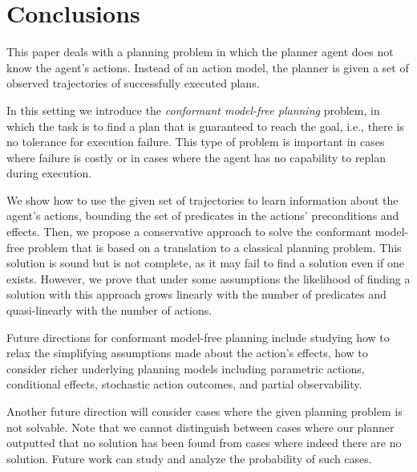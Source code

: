\documentclass[letterpaper]{article}
\begin{document}
\section{Conclusions}
This paper deals with a planning problem in which the planner agent does not know the agent's actions. Instead of an action model, the planner is given a set of observed trajectories of successfully executed plans. 


In this setting we introduce the {\em conformant model-free planning} problem, in which the task is to find a plan that is guaranteed to reach the goal, i.e., there is no tolerance for execution failure. This type of problem is important in cases where failure is costly or in cases where the agent has no capability to replan during execution. 


We show how to use the given set of trajectories to learn
information about the agent's actions, bounding the set of predicates in the actions'  preconditions and effects. Then, we propose a conservative approach to solve the conformant model-free problem that is based on a translation to a classical planning problem. This solution is sound but is not complete, as it may fail to find a solution even if one exists. However, we prove that under some assumptions the likelihood of finding a solution with this approach grows linearly with the number of predicates and quasi-linearly with the number of actions. 


Future directions for conformant model-free planning include studying how to relax the simplifying assumptions made about the action's effects, how to consider richer underlying planning models including parametric actions, conditional effects, stochastic action outcomes, and partial observability.  


Another future direction will consider cases where the given planning problem is not solvable.
Note that we cannot distinguish between cases where our planner outputted that no solution has been found from cases where indeed there are no solution. Future work can study and analyze the probability of such cases.






\newpage



\end{document}
